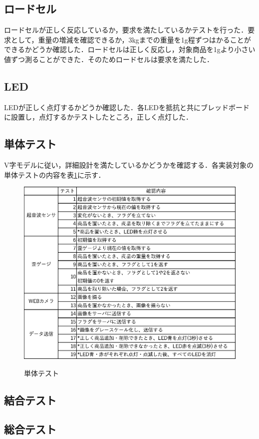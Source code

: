 \subsection*{ロードセル}

ロードセルが正しく反応しているか，要求を満たしているかテストを行った．要求として，重量の増減を確認できるか，3kgまでの重量を1g程ずつはかることができるかどうか確認した．ロードセルは正しく反応し，対象商品を1gより小さい値ずつ測ることができた．そのためロードセルは要求を満たした．

\subsection*{LED}

LEDが正しく点灯するかどうか確認した．各LEDを抵抗と共にブレッドボードに設置し，点灯するかテストしたところ，正しく点灯した．


\subsection{単体テスト}

V字モデルに従い，詳細設計を満たしているかどうかを確認する．各実装対象の単体テストの内容を表\ref{tantai}に示す．

\begin{figure}[htbp]
\centering
\caption{単体テスト}
\includegraphics[width = 15cm]{./picture/tantai.eps}
\label{tantai}
\end{figure}

\subsection{結合テスト}


\subsection{総合テスト}
